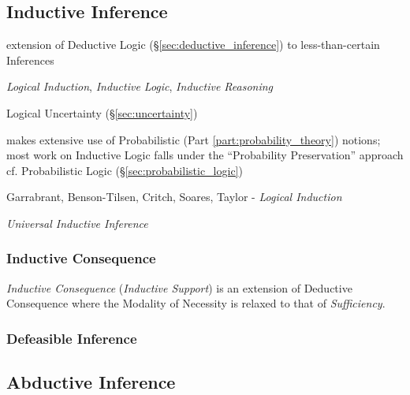 \subsection{Inductive Inference}\label{sec:inductive_inference}
\cite{hawthorne08}

extension of Deductive Logic (\S\ref{sec:deductive_inference}) to
less-than-certain Inferences

\emph{Logical Induction}, \emph{Inductive Logic}, \emph{Inductive Reasoning}

Logical Uncertainty (\S\ref{sec:uncertainty})

makes extensive use of Probabilistic (Part \ref{part:probability_theory})
notions; most work on Inductive Logic falls under the ``Probability
Preservation'' approach
\fist cf. Probabilistic Logic (\S\ref{sec:probabilistic_logic})

Garrabrant, Benson-Tilsen, Critch, Soares, Taylor - \emph{Logical
  Induction} %

\emph{Universal Inductive Inference}



\subsubsection{Inductive Consequence}\label{sec:inductive_consequence}

\emph{Inductive Consequence} (\emph{Inductive Support}) is an
extension of Deductive Consequence where the Modality of Necessity is
relaxed to that of \emph{Sufficiency}.



\subsubsection{Defeasible Inference}\label{sec:defeasible_inference}



\subsection{Abductive Inference}\label{sec:abductive_inference}

